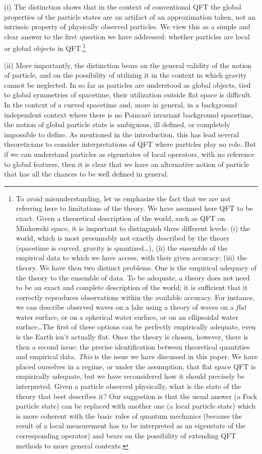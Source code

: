 \documentclass[10pt, nofootinbib]{revtex4}
\begin{document}
(i) The distinction shows that in the context of conventional QFT the
global properties of the particle states are an artifact of an
approximation taken, not an intrinsic property of physically observed
particles.  We view this as a simple and clear answer to the first
question we have addressed: whether particles are local or global
objects in QFT.\footnote{To avoid misunderstanding, let us emphasize
the fact that we are not referring here to limitations of the theory. 
We have assumed here QFT to be exact.  Given a theoretical description
of the world, such as QFT on Minkowski space, it is important to
distinguish three different levels: (i) the world, which is most
presumably not exactly described by the theory (spacetime is curved,
gravity is quantized\ldots), (ii) the ensemble of the empirical data
to which we have access, with their given accuracy; (iii) the theory. 
We have then two distinct problems.  One is the empirical adequacy of
the theory to the ensemble of data.  To be adequate, a theory does not
need to be an exact and complete description of the world; it is
sufficient that it correctly reproduces observations within the
available accuracy.  For instance, we can describe observed waves on a
lake using a theory of waves on a \emph{flat} water surface, or on a
spherical water surface, or on an ellipsoidal water surface\ldots The
first of these options can be perfectly empirically adequate, even is
the Earth isn't actually flat.  Once the theory is chosen, however,
there is then a second issue: the precise identification between
theoretical quantities and empirical data.  \emph{This} is the issue
we have discussed in this paper.  We have placed ourselves in a
regime, or under the assumption, that flat space QFT is empirically
adequate, but we have reconsidered how it should precisely be
interpreted.  Given a particle observed physically, what is the state
of the theory that best describes it?  Our suggestion is that the
usual answer (a Fock particle state) can be replaced with another one
(a local particle state) which is more coherent with the basic rules
of quantum mechanics (because the result of a local measurement has to
be interpreted as an eigenstate of the corresponding operator) and
bears on the possibility of extending QFT methods to more general
contexts.}
%

(ii) More importantly, the distinction bears on the general validity
of the notion of particle, and on the possibility of utilizing it in
the context in which gravity cannot be neglected.  In so far as
particles are understood as global objects, tied to global
symmetries of spacetime, their utilization outside flat space is
difficult.  In the context of a curved spacetime and, more in general,
in a background independent context where there is no Poincar\'e
invariant background spacetime, the notion of global particle state is
ambiguous, ill defined, or completely impossible to define.  As
mentioned in the introduction, this has lead several theoreticians to
consider interpretations of QFT where particles play no role.  But if
we can understand particles as eigenstates of local operators, with no
reference to global features, then it is clear that we have an
alternative notion of particle that has all the chances to be well
defined in general.  
\end{document}
